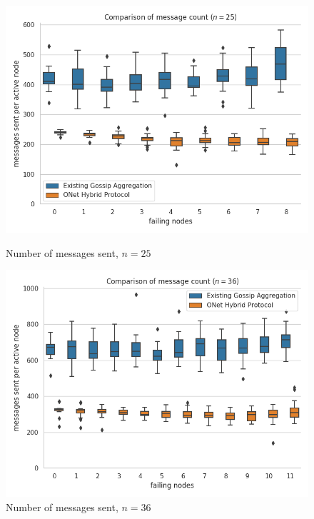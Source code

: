 \begin{figure}[H]
    \centering
    \begin{minipage}{0.5\textwidth}
        \centering
        \includegraphics[width=\textwidth]{images/bandwidth_msg_tx_sum_25.png}
        \captionsetup{labelformat=empty}
        \caption{Number of messages sent, $n = 25$}
    \end{minipage}\hfill
    \begin{minipage}{0.5\textwidth}
        \centering
        \includegraphics[width=\textwidth]{images/bandwidth_msg_tx_sum_36.png}
        \captionsetup{labelformat=empty}
        \caption{Number of messages sent, $n = 36$}
    \end{minipage}\hfill
\end{figure}

